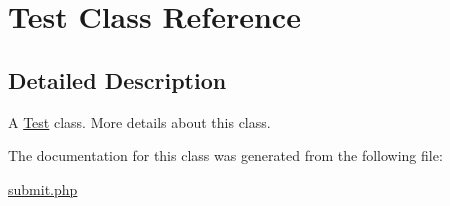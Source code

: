 \hypertarget{class_test}{\section{Test Class Reference}
\label{class_test}
}


\subsection{Detailed Description}
A \hyperlink{class_test}{Test} class. More details about this class. 

The documentation for this class was generated from the following file\+:\begin{DoxyCompactItemize}
\item 
\hyperlink{submit_8php}{submit.\+php}\end{DoxyCompactItemize}
